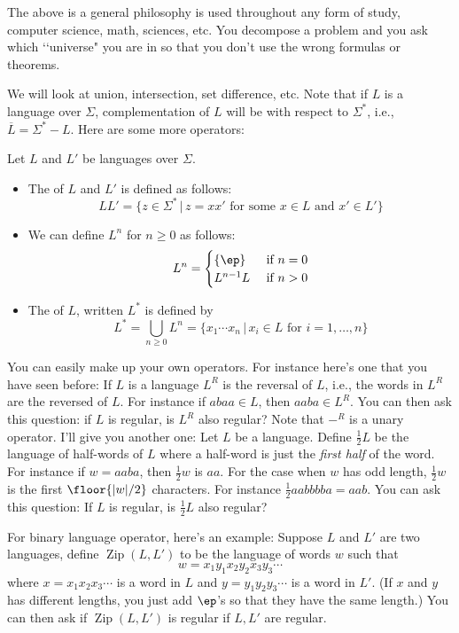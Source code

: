 The above is a general philosophy is used throughout any form of study, 
computer science, math, sciences, etc.
You decompose a problem and you ask which \lq\lq universe" you are in
so that you don't use the wrong formulas or theorems.

We will look at union, intersection, set difference, etc. Note that if $L$
is a language over $\Sigma$, complementation of $L$ will be with
respect to $\Sigma^*$, i.e., $\overline L = \Sigma^* - L$.
Here are some more operators:

\begin{defn}
  Let $L$ and $L'$ be languages over $\Sigma$. 
  \begin{itemize}
  \item
    The
     of $L$ and $L'$ is defined as follows:
    \[
    LL' = \{ z \in \Sigma^* \,|\, z = xx' \text{ for some } x\in L \text{ and } x' \in L'\}
    \]
  \item We can define $L^n$ for $n \geq 0$ as follows:
    \[
    L^n =
    \begin{cases}
      \{ \ep \} & \text{ if } n = 0 \\
      L^{n-1} L  & \text{ if } n > 0 \\
    \end{cases}
    \]
  \item The  of $L$, written $L^*$ is defined by
    \[
    L^* = \bigcup_{n \geq 0} L^n = \{x_1\cdots x_n \,|\, x_i \in L  \text{ for } i=1,\ldots,n \}
    \]
  \end{itemize}
\end{defn}

You can easily make up your own operators.
For instance here's one that you have seen before:
If $L$ is a language $L^R$ is the reversal of $L$, i.e.,
the words in $L^R$ are the reversed of $L$.
For instance if $abaa \in L$, then $aaba \in L^R$.
You can then ask this question: if $L$ is regular, is $L^R$ also regular?
Note that ${-}^R$ is a unary operator.
I'll give you another one:
Let $L$ be a language. Define $\frac{1}{2}L$ be the language
of half-words of $L$ where a half-word is just the \textit{first half} of the word.
For instance if $w = aaba$, then $\frac{1}{2}w$ is $aa$.
For the case when $w$ has odd length,
$\frac{1}{2}w$ is the first $\floor{|w|/2}$ characters.
For instance $\frac{1}{2}aabbbba = aab$.
You can ask this question: If $L$ is regular, is $\frac{1}{2}L$ also regular?

For binary language operator, here's an example:
Suppose $L$ and $L'$ are two languages, define $\operatorname{Zip}(L,L')$
to be the language of words $w$ such that
\[
w = x_1 y_1 x_2 y_2 x_3 y_3 \cdots
\]
where
$x = x_1 x_2 x_3 \cdots$ is a word in $L$
and
$y = y_1 y_2 y_3 \cdots$ is a word in $L'$.
(If $x$ and $y$ has different lengths, you just add $\ep$'s so that they have the same length.)
You can then ask if 
$\operatorname{Zip}(L,L')$ is regular
if
$L,L'$ are regular.


